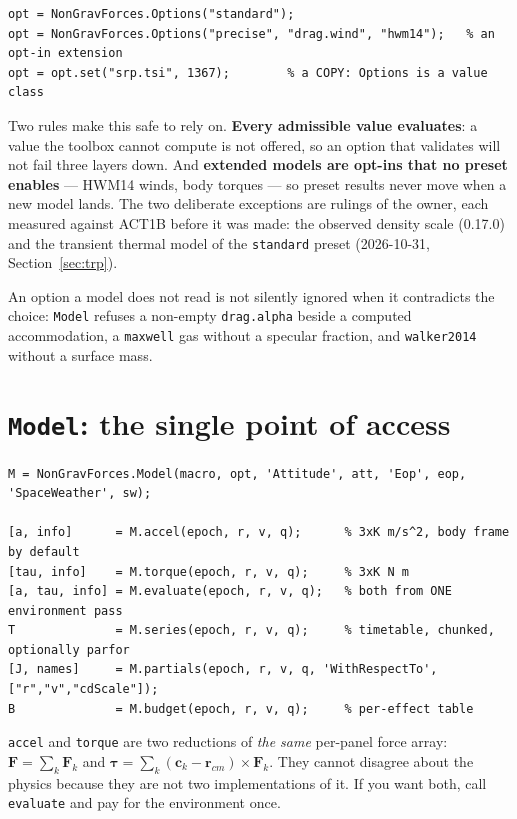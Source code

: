 \documentclass[11pt,a4paper]{report}
\newcommand{\vv}[1]{\bm{#1}}
\begin{document}
\begin{lstlisting}
opt = NonGravForces.Options("standard");
opt = NonGravForces.Options("precise", "drag.wind", "hwm14");   % an opt-in extension
opt = opt.set("srp.tsi", 1367);        % a COPY: Options is a value class
\end{lstlisting}

\noindent Two rules make this safe to rely on. \textbf{Every admissible value evaluates}: a value
the toolbox cannot compute is not offered, so an option that validates will not fail three layers
down. And \textbf{extended models are opt-ins that no preset enables} --- HWM14 winds, body torques
--- so preset results never move when a new model lands. The two deliberate exceptions are rulings
of the owner, each measured against ACT1B before it was made: the observed density scale (0.17.0)
and the transient thermal model of the \texttt{standard} preset (2026-10-31, Section~\ref{sec:trp}).

An option a model does not read is not silently ignored when it contradicts the choice:
\texttt{Model} refuses a non-empty \texttt{drag.alpha} beside a computed accommodation, a
\texttt{maxwell} gas without a specular fraction, and \texttt{walker2014} without a surface mass.

\section{\texttt{Model}: the single point of access}
\begin{lstlisting}
M = NonGravForces.Model(macro, opt, 'Attitude', att, 'Eop', eop, 'SpaceWeather', sw);

[a, info]      = M.accel(epoch, r, v, q);      % 3xK m/s^2, body frame by default
[tau, info]    = M.torque(epoch, r, v, q);     % 3xK N m
[a, tau, info] = M.evaluate(epoch, r, v, q);   % both from ONE environment pass
T              = M.series(epoch, r, v, q);     % timetable, chunked, optionally parfor
[J, names]     = M.partials(epoch, r, v, q, 'WithRespectTo', ["r","v","cdScale"]);
B              = M.budget(epoch, r, v, q);     % per-effect table
\end{lstlisting}

\noindent \texttt{accel} and \texttt{torque} are two reductions of \emph{the same} per-panel force
array: $\vv F=\sum_k\vv F_k$ and $\vv\tau=\sum_k(\vv c_k-\vv r_{cm})\times\vv F_k$. They cannot
disagree about the physics because they are not two implementations of it. If you want both, call
\texttt{evaluate} and pay for the environment once.
\end{document}
